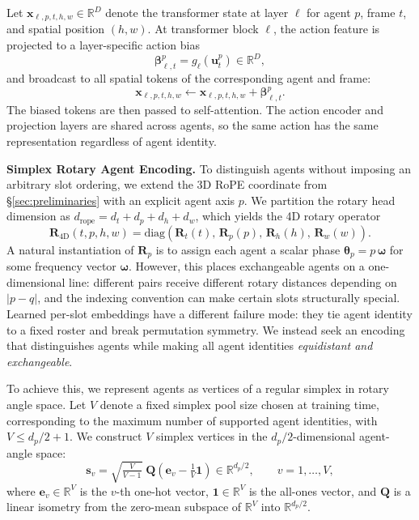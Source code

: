 Let $\mathbf{x}_{\ell,p,t,h,w}\in\mathbb{R}^{D}$ denote the transformer state at layer $\ell$ for agent $p$, frame $t$, and spatial position $(h,w)$.
At transformer block $\ell$, the action feature is projected to a layer-specific action bias
\begin{equation}
\boldsymbol{\beta}_{\ell,t}^p = g_\ell(\mathbf{u}_t^p) \in \mathbb{R}^{D},
\end{equation}
and broadcast to all spatial tokens of the corresponding agent and frame:
\begin{equation}
\mathbf{x}_{\ell,p,t,h,w}
\leftarrow
\mathbf{x}_{\ell,p,t,h,w}
+
\boldsymbol{\beta}_{\ell,t}^p .
\end{equation}
The biased tokens are then passed to self-attention.
The action encoder and projection layers are shared across agents, so the same action has the same representation regardless of agent identity. 



\noindent\textbf{Simplex Rotary Agent Encoding.}
\label{sec:simplex-rotary-agent-encoding}
To distinguish agents without imposing an arbitrary slot ordering, we extend the 3D RoPE coordinate from \S\ref{sec:preliminaries} with an explicit agent axis $p$.
We partition the rotary head dimension as
$d_{\mathrm{rope}}=d_t+d_p+d_h+d_w$,
which yields the 4D rotary operator
\begin{equation}
\mathbf{R}_{\mathrm{4D}}(t,p,h,w) = \mathrm{diag}\!\left(\mathbf{R}_{t}(t),\,\mathbf{R}_{p}(p),\,\mathbf{R}_{h}(h),\,\mathbf{R}_{w}(w)\right).
\end{equation}
A natural instantiation of $\mathbf{R}_{p}$ is to assign each agent a scalar phase $\boldsymbol{\theta}_p=p\,\boldsymbol{\omega}$ for some frequency vector $\boldsymbol{\omega}$.
However, this places exchangeable agents on a one-dimensional line: different pairs receive different rotary distances depending on $|p-q|$, and the indexing convention can make certain slots structurally special.
Learned per-slot embeddings have a different failure mode: they tie agent identity to a fixed roster and break permutation symmetry.
We instead seek an encoding that distinguishes agents while making all agent identities \emph{equidistant and exchangeable}.


To achieve this, we represent agents as vertices of a regular simplex in rotary angle space.
Let $V$ denote a fixed simplex pool size chosen at training time, corresponding to the maximum number of supported agent identities, with $V\leq d_p/2+1$.
We construct $V$ simplex vertices in the $d_p/2$-dimensional agent-angle space:
\begin{equation}
\mathbf{s}_v
=
\sqrt{\tfrac{V}{V-1}}\;
\mathbf{Q}\!\left(\mathbf{e}_v-\tfrac{1}{V}\mathbf{1}\right)
\in\mathbb{R}^{d_p/2},
\qquad v=1,\ldots,V,
\end{equation}
where $\mathbf{e}_v\in\mathbb{R}^{V}$ is the $v$-th one-hot vector, $\mathbf{1}\in\mathbb{R}^{V}$ is the all-ones vector, and $\mathbf{Q}$ is a linear isometry from the zero-mean subspace of $\mathbb{R}^{V}$ into $\mathbb{R}^{d_p/2}$.


